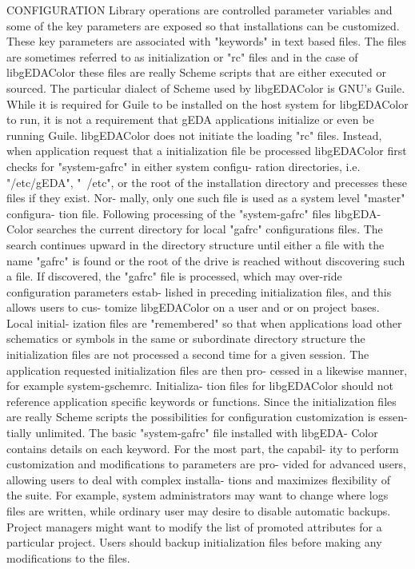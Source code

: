 CONFIGURATION
       Library  operations  are controlled parameter variables and some of the
       key parameters are exposed so that  installations  can  be  customized.
       These  key  parameters  are  associated  with  "keywords" in text based
       files. The files are sometimes referred to as  initialization  or  "rc"
       files  and  in  the  case of libgEDAColor these files are really Scheme
       scripts that are either executed or sourced.  The   particular  dialect
       of Scheme used by libgEDAColor is GNU's Guile. While it is required for
       Guile to be installed on the host system for libgEDAColor to run, it is
       not  a requirement that gEDA applications initialize or even be running
       Guile.  libgEDAColor does not initiate the loading "rc" files. Instead,
       when  application  request  that  a  initialization  file  be processed
       libgEDAColor first checks for "system-gafrc" in either system  configu-
       ration  directories,  i.e.  "/etc/gEDA",  "~/etc",  or  the root of the
       installation directory and precesses these files if  they  exist.  Nor-
       mally, only one such file is used as a system level "master" configura-
       tion file. Following processing of the  "system-gafrc"  files  libgEDA-
       Color  searches  the current directory for local "gafrc" configurations
       files. The search continues upward in  the  directory  structure  until
       either  a  file with the name "gafrc" is found or the root of the drive
       is reached without discovering such a file. If discovered, the  "gafrc"
       file  is processed, which may over-ride configuration parameters estab-
       lished in preceding initialization files, and this allows users to cus-
       tomize  libgEDAColor  on a user and or on project bases. Local initial-
       ization files are "remembered" so that  when  applications  load  other
       schematics  or  symbols  in the same or subordinate directory structure
       the initialization files are not processed a second time  for  a  given
       session.  The  application requested initialization files are then pro-
       cessed in a likewise manner, for example system-gschemrc.   Initializa-
       tion  files  for libgEDAColor should not reference application specific
       keywords or functions. Since the initialization files are really Scheme
       scripts  the  possibilities  for  configuration customization is essen-
       tially unlimited. The basic "system-gafrc" file installed with libgEDA-
       Color contains details on each keyword. For the most part, the capabil-
       ity to perform customization and modifications to parameters  are  pro-
       vided for advanced users, allowing users to deal with complex installa-
       tions and maximizes flexibility  of  the  suite.  For  example,  system
       administrators  may  want to change where logs files are written, while
       ordinary user may desire to disable automatic backups. Project managers
       might  want  to modify the list of promoted attributes for a particular
       project. Users should backup initialization  files  before  making  any
       modifications to the files.

